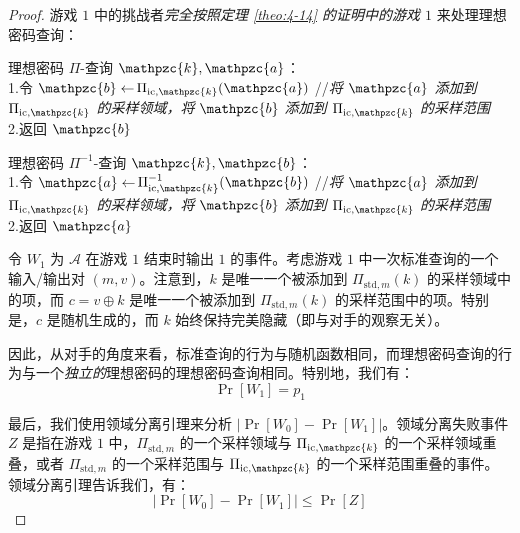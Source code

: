 \begin{proof}
\vspace{5pt}

游戏 $1$ 中的挑战者\emph{完全按照定理 \ref{theo:4-14} 的证明中的游戏 $1$} 来处理理想密码查询：

\vspace{5pt}

\hspace*{5pt} 理想密码 $\Pi$-查询 $\mathpzc{k},\mathpzc{a}$：\\
\hspace*{26pt} 1.\qquad 令 $\mathpzc{b}\leftarrow$\colorbox{gray!50}{$\Pi_{\mathrm{ic},\mathpzc{k}}(\mathpzc{a})$}
\;\;\quad//\quad\emph{将 $\mathpzc{a}$ 添加到 $\Pi_{\mathrm{ic},\mathpzc{k}}$ 的采样领域，将 $\mathpzc{b}$ 添加到 $\Pi_{\mathrm{ic},\mathpzc{k}}$ 的采样范围}\\
\hspace*{26pt} 2.\qquad 返回 $\mathpzc{b}$

\vspace{5pt}

\hspace*{5pt} 理想密码 $\Pi^{-1}$-查询 $\mathpzc{k},\mathpzc{b}$：\\
\hspace*{26pt} 1.\qquad 令 $\mathpzc{a}\leftarrow$\colorbox{gray!50}{$\Pi_{\mathrm{ic},\mathpzc{k}}^{-1}(\mathpzc{b})$}
\;\;\quad//\quad\emph{将 $\mathpzc{a}$ 添加到 $\Pi_{\mathrm{ic},\mathpzc{k}}$ 的采样领域，将 $\mathpzc{b}$ 添加到 $\Pi_{\mathrm{ic},\mathpzc{k}}$ 的采样范围}\\
\hspace*{26pt} 2.\qquad 返回 $\mathpzc{a}$

\vspace{5pt}

令 $W_1$ 为 $\mathcal{A}$ 在游戏 $1$ 结束时输出 $1$ 的事件。考虑游戏 $1$ 中一次标准查询的一个输入/输出对 $(m,v)$。注意到，$k$ 是唯一一个被添加到 $\Pi_{\mathrm{std},m}(k)$ 的采样领域中的项，而 $c=v\oplus k$ 是唯一一个被添加到 $\Pi_{\mathrm{std},m}(k)$ 的采样范围中的项。特别是，$c$ 是随机生成的，而 $k$ 始终保持完美隐藏（即与对手的观察无关）。

因此，从对手的角度来看，标准查询的行为与随机函数相同，而理想密码查询的行为与一个\emph{独立的}理想密码的理想密码查询相同。特别地，我们有：
\begin{equation}\label{eq:8-9}
\Pr[W_1]=p_1
\end{equation}

最后，我们使用领域分离引理来分析 $|\Pr[W_0]-\Pr[W_1]|$。领域分离失败事件 $Z$ 是指在游戏 $1$ 中，$\Pi_{\mathrm{std},m}$ 的一个采样领域与 $\Pi_{\mathrm{ic},\mathpzc{k}}$ 的一个采样领域重叠，或者 $\Pi_{\mathrm{std},m}$ 的一个采样范围与 $\Pi_{\mathrm{ic},\mathpzc{k}}$ 的一个采样范围重叠的事件。领域分离引理告诉我们，有：
\begin{equation}\label{eq:8-10}
|\Pr[W_0]-\Pr[W_1]|\leq\Pr[Z]
\end{equation}


\end{proof}
